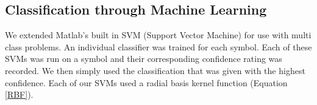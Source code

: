 \subsection{Classification through Machine Learning}
We extended Matlab's built in SVM (Support Vector Machine) for use with multi class problems. An individual classifier was trained for each symbol. Each of these SVMs was run on a symbol and their corresponding confidence rating was recorded. We then simply used the classification that was given with the highest confidence. Each of our SVMs used a radial basis kernel function (Equation \ref{RBF}). 
